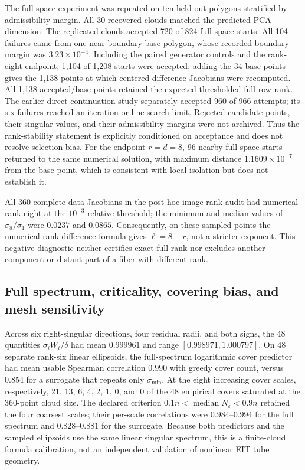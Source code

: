 \documentclass[11pt]{article}
\theoremstyle{definition}
\begin{document}
The full-space experiment was repeated on ten held-out polygons stratified by
admissibility margin.  All 30 recovered clouds matched the predicted PCA
dimension.  The replicated clouds accepted 720 of 824 full-space starts.  All
104 failures came from one near-boundary base polygon, whose recorded boundary
margin was $3.23\times10^{-4}$.  Including the paired generator controls and
the rank-eight endpoint, 1,104 of 1,208 starts were accepted; adding the 34
base points gives the 1,138 points at which centered-difference Jacobians were
recomputed.  All 1,138 accepted/base points retained the expected thresholded full
row rank.  The earlier direct-continuation study separately accepted 960 of
966 attempts; its six failures reached an iteration or line-search limit.
Rejected candidate points, their singular values, and their admissibility
margins were not archived.  Thus the rank-stability statement is explicitly
conditioned on acceptance and does not resolve selection bias.  For the
endpoint $r=d=8$, 96 nearby full-space starts returned to the same numerical
solution, with maximum distance $1.1609\times10^{-7}$ from the base point,
which is consistent with local isolation but does not establish it.

All 360 complete-data Jacobians in the post-hoc image-rank audit had numerical
rank eight at the $10^{-3}$ relative threshold; the minimum and median values
of $\sigma_8/\sigma_1$ were $0.0237$ and $0.0865$.  Consequently, on these
sampled points the numerical rank-difference formula gives $\ell=8-r$, not a
stricter exponent.  This negative diagnostic neither certifies exact full rank
nor excludes another component or distant part of a fiber with different
rank.

\subsection{Full spectrum, criticality, covering bias, and mesh sensitivity}

Across six right-singular directions, four residual radii, and both signs, the
48 quantities $\sigma_iW_i/\delta$ had mean $0.999961$ and range
$[0.998971,1.000797]$.  On 48 separate rank-six linear ellipsoids, the
full-spectrum logarithmic cover predictor had mean usable Spearman correlation
$0.990$ with greedy cover count, versus $0.854$ for a surrogate that repeats
only $\sigma_{\min}$.  At the eight increasing cover scales, respectively,
21, 13, 6, 4, 2, 1, 0, and 0 of the 48 empirical covers saturated at the
360-point cloud size.  The declared criterion
$0.1n<\operatorname{median}N_\varepsilon<0.9n$ retained the four coarsest
scales; their per-scale correlations were $0.984$--$0.994$ for the full
spectrum and $0.828$--$0.881$ for the surrogate.  Because both predictors and
the sampled ellipsoids use the same linear singular spectrum, this is a
finite-cloud formula calibration, not an independent validation of nonlinear
EIT tube geometry.
\end{document}
